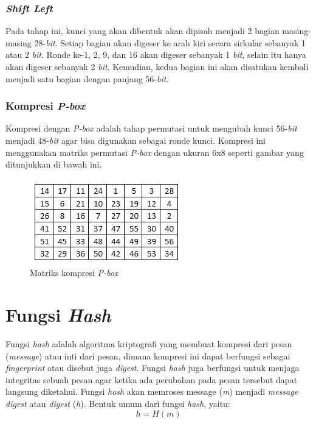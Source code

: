 \subsubsection{\textit{Shift Left}}
Pada tahap ini, kunci yang akan dibentuk akan dipisah menjadi 2 bagian masing-masing 28-\textit{bit}. Setiap bagian akan digeser ke arah kiri secara sirkular sebanyak 1 atau 2 \textit{bit}. Ronde ke-1, 2, 9, dan 16 akan digeser sebanyak 1 \textit{bit}, selain itu hanya akan digeser sebanyak 2 \textit{bit}. Kemudian, kedua bagian ini akan disatukan kembali menjadi satu bagian dengan panjang 56-\textit{bit}.

\subsubsection{Kompresi \textit{P-box}}
\label{sssec:kompresi_Pbox}
Kompresi dengan \textit{P-box} adalah tahap permutasi untuk mengubah kunci 56-\textit{bit} menjadi 48-\textit{bit} agar bisa digunakan sebagai ronde kunci. Kompresi ini menggunakan matriks permutasi \textit{P-box} dengan ukuran 6x8 seperti gambar yang ditunjukkan di bawah ini.

\begin{figure}[ht]
	\includegraphics[scale=0.8]{Gambar/key_compression_matrix}
	\centering
	\caption{Matriks kompresi \textit{P-box}}
\end{figure}

\section{Fungsi \textit{Hash}}
Fungsi \textit{hash} adalah algoritma kriptografi yang membuat kompresi dari pesan (\textit{message}) atau inti dari pesan, dimana kompresi ini dapat berfungsi sebagai \textit{fingerprint} atau disebut juga \textit{digest}. Fungsi \textit{hash} juga berfungsi untuk menjaga integritas sebuah pesan agar ketika ada perubahan pada pesan tersebut dapat langsung diketahui. Fungsi \textit{hash} akan memroses message (\textit{m}) menjadi \textit{message digest} atau \textit{digest} (\textit{h}). Bentuk umum dari fungsi \textit{hash}, yaitu:
\begin{displaymath}
	h = H(m)
\end{displaymath}

